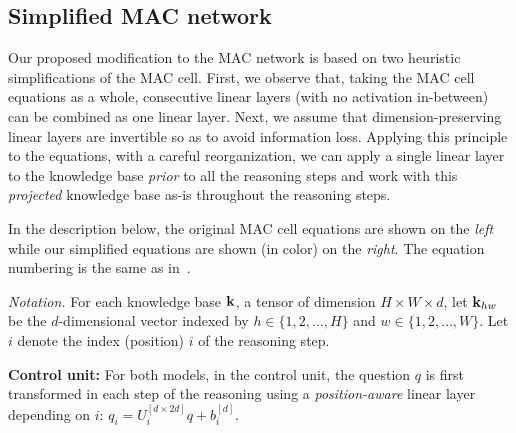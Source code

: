 \subsection{Simplified MAC network}
Our proposed modification to the MAC network is based on two heuristic
simplifications of the MAC cell. 
First, we observe that, taking the MAC cell equations as a whole, consecutive linear layers (with no activation in-between) can be combined as one linear layer.
Next, we assume that dimension-preserving linear layers are invertible
so as to avoid information loss. 
Applying this principle to the equations, with a careful reorganization,
we can apply a single linear layer to the knowledge base \emph{prior}
to all the reasoning steps and work with this \emph{projected} knowledge base
as-is throughout the reasoning steps.





In the description below, the original MAC cell equations are shown on the \emph{left}
while our simplified equations are shown (in color) on the {\color{Plum} \emph{right}}.
The equation numbering is the same as in~\cite{hudson2018compositional}.

\noindent\textit{Notation.}
For each knowledge base $\mathbf{k}$, a tensor of dimension $H \times W \times d$, let $\mathbf{k}_{hw}$ be the $d$-dimensional vector indexed by 
$h \in \{1,2,\dots,H\}$ and $w \in \{1,2,\dots, W\}$.
Let $i$ denote the index (position) $i$ of the reasoning step. 

\noindent\textbf{Control unit:} 
For both models, in the control unit, the question $q$ is first transformed in each step of 
the reasoning using a \emph{position-aware}
linear layer depending on $i$: $q_i = U_i^{[d \times 2d]} q + b_i^{[d]}$.

